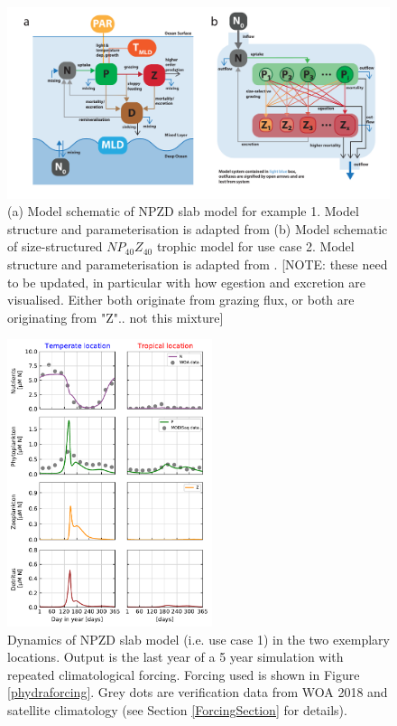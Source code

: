 \documentclass[template.tex]{subfiles}
\begin{document}
\begin{figure}[t]
\includegraphics[width=15cm]{Figures/firstdraft_schematics/02__schematics_NPZDandChemostat.pdf}
\caption{(a) Model schematic of NPZD slab model for example 1. Model structure and parameterisation is adapted
from \citet{Anderson2015c} (b) Model schematic of size-structured $NP_{40}Z_{40}$ trophic model for use case 2. Model structure and parameterisation is adapted from \citet{Banas2011b}. [NOTE: these need to be updated, in particular with how egestion and excretion are visualised. Either both originate from grazing flux, or both are originating from "Z".. not this mixture]}
\label{phydraschematics_1}
\end{figure}


\begin{figure}[t]
\includegraphics[width=6cm]{Figures/firstdraft_plots/02_NPZDslab.pdf}
\caption{Dynamics of NPZD slab model (i.e. use case 1) in the two exemplary locations. Output is the last year of a 5 year simulation with repeated climatological forcing. Forcing used is shown in Figure \ref{phydraforcing}. Grey dots are verification data from WOA 2018 and satellite climatology (see Section \ref{ForcingSection} for details).}
\label{NPZDslab_results}
\end{figure}
\end{document}

